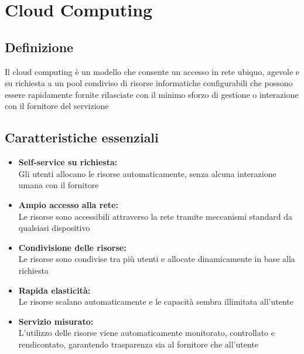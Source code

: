 \chapter{Cloud Computing}
\section{Definizione}
Il cloud computing è un modello che consente un accesso in rete ubiquo, agevole e su richiesta a un pool condiviso di risorse informatiche configurabili che possono essere rapidamente fornite rilasciate con il minimo sforzo di gestione o interazione con il fornitore del servizione

\section{Caratteristiche essenziali}
\begin{itemize}
    \item \textbf{Self-service su richiesta:}\\
    Gli utenti allocano le risorse automaticamente, senza alcuna interazione umana con il fornitore
    \item \textbf{Ampio accesso alla rete:}\\
    Le risorse sono accessibili attraverso la rete tramite meccanismi standard da qualsiasi dispositivo
    \item \textbf{Condivisione delle risorse:}\\
    Le risorse sono condivise tra più utenti e allocate dinamicamente in base alla richiesta
    \item \textbf{Rapida elasticità:} \\
    Le risorse scalano automaticamente e le capacità sembra illimitata all'utente
    \item \textbf{Servizio misurato:}\\
    L'utilizzo delle risorse viene automaticamente monitorato, controllato e rendicontato, garantendo trasparenza sia al fornitore che all'utente
\end{itemize}

